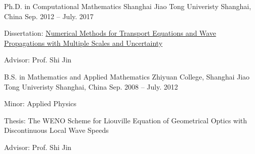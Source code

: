 
\begin{cventries}

  \cventry
  {Ph.D. in Computational Mathematics} %
  {Shanghai Jiao Tong Univeristy} %
  {Shanghai, China} %
  {Sep. 2012 -- July. 2017} %
  {
    \begin{cvitems} %
    \item {Dissertation: \href{https://zheng-home.netlify.app/thesis.pdf}{Numerical Methods for Transport Equations and Wave Propagations with Multiple Scales and Uncertainty}}
    \item {Advisor: Prof. Shi Jin}
    \end{cvitems}
  }

  \cventry
  {B.S. in Mathematics and Applied Mathematics} %
  {Zhiyuan College, Shanghai Jiao Tong Univeristy} %
  {Shanghai, China} %
  {Sep. 2008 -- July. 2012} %
  {
    \begin{cvitems} %
    \item {Minor: Applied Physics}
    \item {Thesis: The WENO Scheme for Liouville Equation of Geometrical
      Optics with Discontinuous Local Wave Speeds}
    \item {Advisor: Prof. Shi Jin}
    \end{cvitems}
  }

\end{cventries}
